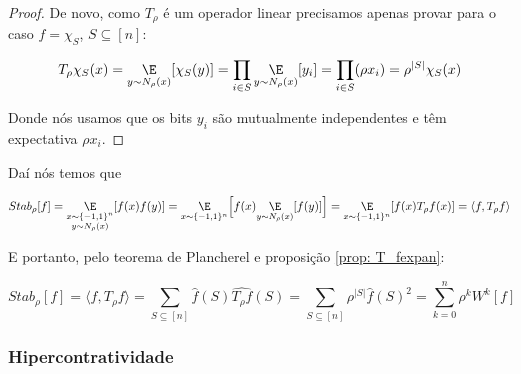 \begin{proof}

    De novo, como $T_{\rho}$ é um operador linear precisamos apenas provar para o caso $f = \chi_{S}$, $S \subseteq [n]$:

    \begin{equation*}
        T_{\rho}\chi_{S}(x) = \underset{y \sim N_{\rho}(x)}{\E}[\chi_{S}(y)] = \prod_{i \in S}\underset{y \sim N_{\rho}(x)}{\E}[y_{i}] = \prod_{i \in S}(\rho x_{i}) = \rho^{\lvert S \rvert}\chi_{S}(x)
    \end{equation*}  

    Donde nós usamos que os bits $y_{i}$ são mutualmente independentes e têm expectativa $\rho x_{i}$.  

\end{proof}

Daí nós temos que

\begin{equation*}
    Stab_{\rho}[f] = \underset{\substack{x \sim \pmonen \\ y \sim N_{\rho}(x)}}{\E}[f(x)f(y)] = \underset{x \sim \pmonen }{\E}\Big[f(x)\underset{y \sim N_{\rho}(x)}{\E}[f(y)]\Big] = \underset{x \sim \pmonen}{\E}[f(x)T_{\rho}f(x)] = \langle f, T_{\rho}f \rangle
\end{equation*}

E portanto, pelo teorema de Plancherel e proposição \ref{prop: T_fexpan}:

\begin{equation} \label{fourier_stab}
    Stab_{\rho}[f] = \langle f, T_{\rho}f \rangle = \sum_{S \subseteq [n]} \widehat{f}(S) \widehat{T_{\rho}f}(S)
                                                  = \sum_{S \subseteq [n]} \rho^{\lvert S \rvert} \widehat{f}(S)^{2}
                                                  = \sum_{k = 0}^{n} \rho^{k} W^{k}[f]
\end{equation}

\subsubsection{Hipercontratividade}




